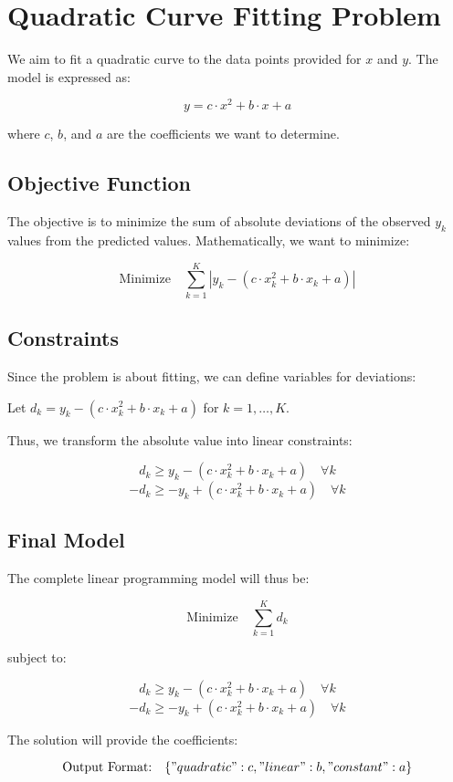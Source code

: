 \documentclass{article}
\begin{document}
\section*{Quadratic Curve Fitting Problem}

We aim to fit a quadratic curve to the data points provided for \(x\) and \(y\). The model is expressed as:

\[
y = c \cdot x^2 + b \cdot x + a
\]

where \(c\), \(b\), and \(a\) are the coefficients we want to determine.

\subsection*{Objective Function}

The objective is to minimize the sum of absolute deviations of the observed \(y_k\) values from the predicted values. Mathematically, we want to minimize:

\[
\text{Minimize} \quad \sum_{k=1}^{K} |y_k - (c \cdot x_k^2 + b \cdot x_k + a)|
\]

\subsection*{Constraints}

Since the problem is about fitting, we can define variables for deviations:

Let \(d_k = y_k - (c \cdot x_k^2 + b \cdot x_k + a)\) for \(k = 1, \ldots, K\).

Thus, we transform the absolute value into linear constraints:

\[
d_k \geq y_k - (c \cdot x_k^2 + b \cdot x_k + a) \quad \forall k
\]
\[
-d_k \geq -y_k + (c \cdot x_k^2 + b \cdot x_k + a) \quad \forall k
\]

\subsection*{Final Model}

The complete linear programming model will thus be:

\[
\text{Minimize} \quad \sum_{k=1}^{K} d_k
\]

subject to:

\[
d_k \geq y_k - (c \cdot x_k^2 + b \cdot x_k + a) \quad \forall k
\]
\[
-d_k \geq -y_k + (c \cdot x_k^2 + b \cdot x_k + a) \quad \forall k
\]

The solution will provide the coefficients:

\[
\text{Output Format:} \quad \{ "quadratic": c, "linear": b, "constant": a \}
\]
\end{document}
